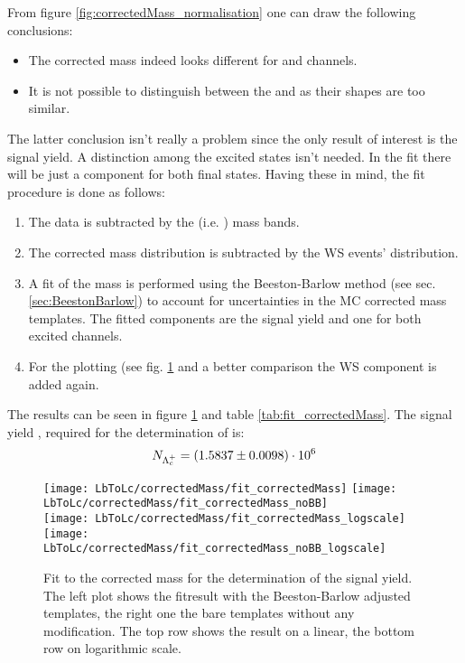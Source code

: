 From figure \ref{fig:correctedMass_normalisation} one can draw the following conclusions:
\begin{itemize}
    \item The corrected \pKpi\mun mass indeed looks different for \Lc and \Lcstar channels.
    \item It is not possible to distinguish between the  and  as their shapes are too similar.
\end{itemize}
The latter conclusion isn't really a problem since the only result of interest is the \LbToLcmunu signal yield. 
A distinction among the excited states isn't needed.
In the fit there will be just a component for both final states.
Having these in mind, the fit procedure is done as follows:
\begin{enumerate}
    \item The data is subtracted by the \pKpi (i.e. \Lc) mass bands.
    \item The corrected \pKpi\mun mass distribution is subtracted by the WS events' distribution.
    \item A fit of the \pKpi\mun mass is performed using the Beeston-Barlow method (see sec. \ref{sec:BeestonBarlow}) to account for uncertainties in the MC corrected mass templates. The fitted components are the \Lc signal yield and one for both excited \Lcstar channels.
    \item For the plotting (see fig. \ref{fig:correctedMass_fit} and a better comparison the WS component is added again.
\end{enumerate}
The results can be seen in figure \ref{fig:correctedMass_fit} and table \ref{tab:fit_correctedMass}. The \LbToLcmunu signal yield \NLc, required for the determination of \R is:
\begin{align*}
    N_{{{\Lambda}^+_{c}}} = (1.5837 \pm 0.0098)\cdot 10^{6}
\end{align*}
\begin{figure}[hptb]
	\centering
	\texttt{[image: LbToLc/correctedMass/fit\_correctedMass]}
	\texttt{[image: LbToLc/correctedMass/fit\_correctedMass\_noBB]} \\
	\texttt{[image: LbToLc/correctedMass/fit\_correctedMass\_logscale]}
	\texttt{[image: LbToLc/correctedMass/fit\_correctedMass\_noBB\_logscale]}
	\caption{Fit to the \pKpi\mun corrected mass for the determination of the \LbToLcmunu signal yield. The left plot shows the fitresult with the Beeston-Barlow adjusted templates, the right one the bare templates without any modification. The top row shows the result on a linear, the bottom row on logarithmic scale.}
	\label{fig:correctedMass_fit}
\end{figure}


